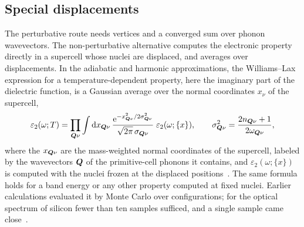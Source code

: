 \subsection{Special displacements}

The perturbative route needs vertices and a converged sum over phonon wavevectors. The non-perturbative alternative computes the electronic property directly in a supercell whose nuclei are displaced, and averages over displacements. In the adiabatic and harmonic approximations, the Williams--Lax expression for a temperature-dependent property, here the imaginary part of the dielectric function, is a Gaussian average over the normal coordinates $x_\nu$ of the supercell,
\begin{equation}
  \varepsilon_2(\omega;T) = \prod_{\bm{Q}\nu}\int\mathrm{d} x_{\bm{Q}\nu}\,\frac{\mathrm{e}^{-x_{\bm{Q}\nu}^2/2\sigma_{\bm{Q}\nu}^2}}{\sqrt{2\pi}\,\sigma_{\bm{Q}\nu}}\;\varepsilon_2(\omega;\{x\}), \qquad \sigma_{\bm{Q}\nu}^2 = \frac{2n_{\bm{Q}\nu} + 1}{2\omega_{\bm{Q}\nu}} ,
  \label{eq:E.8-wl}
\end{equation}
where the $x_{\bm{Q}\nu}$ are the mass-weighted normal coordinates of the supercell, labeled by the wavevectors $\bm{Q}$ of the primitive-cell phonons it contains, and $\varepsilon_2(\omega;\{x\})$ is computed with the nuclei frozen at the displaced positions~\cite[Eqs.~(3) and~(4), with mass-weighted coordinates]{zacharias2016one}. The same formula holds for a band energy or any other property computed at fixed nuclei. Earlier calculations evaluated it by Monte Carlo over configurations; for the optical spectrum of silicon fewer than ten samples sufficed, and a single sample came close~\cite[Sect.~II]{zacharias2016one}.

